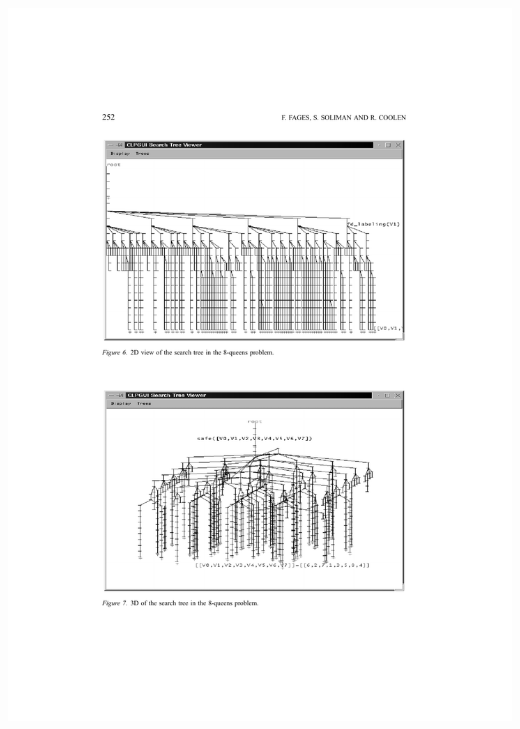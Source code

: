\documentclass[dvipsnames,aspectratio=169]{beamer}
\begin{document}
\begin{frame}
  \includegraphics[height=0.8\textheight]{images/fages_et_al_tree.pdf}
\end{frame}
\end{document}
